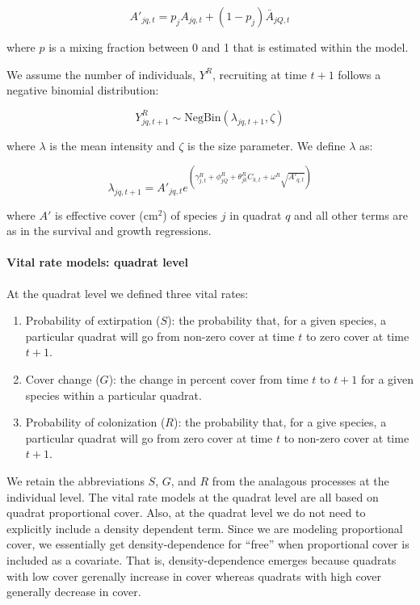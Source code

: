 \documentclass[author-year, 12pt,review]{components/elsarticle} %
\begin{document}
\begin{equation}
A'_{jq,t} = p_{j}A_{jq,t} + (1-p_{j})\bar{A}_{jQ,t}
\end{equation}

where $p$ is a mixing fraction between 0 and 1 that is estimated within
the model.

We assume the number of individuals, $Y^{R}$, recruiting at time $t+1$
follows a negative binomial distribution:

\begin{equation}
Y^{R}_{jq,t+1} \sim \text{NegBin}(\lambda_{jq,t+1},\zeta)
\end{equation}

where $\lambda$ is the mean intensity and $\zeta$ is the size parameter.
We define $\lambda$ as:

\begin{equation}
\lambda_{jq,t+1} = A'_{jq,t}e^{(\gamma^{R}_{j,t} + \phi^{R}_{jQ} + \theta^{R}_{jk}C_{k,t} + \omega^{R}\sqrt{A'_{q,t}})}
\end{equation}

where $A'$ is effective cover ($\text{cm}^2$) of species $j$ in quadrat
$q$ and all other terms are as in the survival and growth regressions.

\paragraph{Vital rate models: quadrat
level}\label{vital-rate-models-quadrat-level}

At the quadrat level we defined three vital rates:

\begin{enumerate}
\def\labelenumi{\arabic{enumi}.}
\itemsep1pt\parskip0pt
\item
  Probability of extirpation ($S$): the probability that, for a given
  species, a particular quadrat will go from non-zero cover at time $t$
  to zero cover at time $t+1$.
\item
  Cover change ($G$): the change in percent cover from time $t$ to $t+1$
  for a given species within a particular quadrat.
\item
  Probability of colonization ($R$): the probability that, for a give
  species, a particular quadrat will go from zero cover at time $t$ to
  non-zero cover at time $t+1$.
\end{enumerate}

We retain the abbreviations $S$, $G$, and $R$ from the analagous
processes at the individual level. The vital rate models at the quadrat
level are all based on quadrat proportional cover. Also, at the quadrat
level we do not need to explicitly include a density dependent term.
Since we are modeling proportional cover, we essentially get
density-dependence for ``free'' when proportional cover is included as a
covariate. That is, density-dependence emerges because quadrats with low
cover gerenally increase in cover whereas quadrats with high cover
generally decrease in cover.
\end{document}
